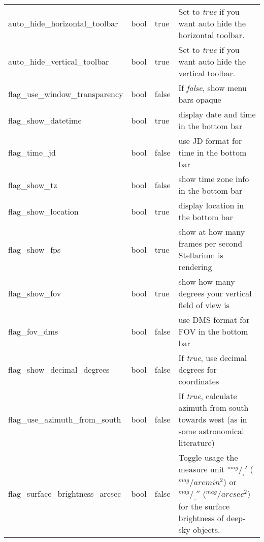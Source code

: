 \begin{longtable}{p{50mm}|l|l|p{55mm}}
auto\_hide\_horizontal\_toolbar & bool   & true  & Set to \emph{true} if you want auto hide the horizontal toolbar.\\%
auto\_hide\_vertical\_toolbar   & bool   & true  & Set to \emph{true} if you want auto hide the vertical toolbar.\\%
flag\_use\_window\_transparency & bool   & false & If \emph{false}, show menu bars opaque\\%
flag\_show\_datetime            & bool   & true  & display date and time in the bottom bar\\%
flag\_time\_jd                  & bool   & false & use JD format for time in the bottom bar\\%
flag\_show\_tz                  & bool   & false & show time zone info in the bottom bar\\%
flag\_show\_location            & bool   & true  & display location in the bottom bar\\%
flag\_show\_fps                 & bool   & true  & show at how many frames per second Stellarium is rendering\\%
flag\_show\_fov                 & bool   & true  & show how many degrees your vertical field of view is\\%
flag\_fov\_dms                  & bool   & false & use DMS format for FOV in the bottom bar\\\midrule
%
flag\_show\_decimal\_degrees    & bool   & false & If \emph{true}, use decimal degrees for coordinates\\\midrule
flag\_use\_azimuth\_from\_south & bool   & false & If \emph{true}, calculate azimuth from south towards west 
                                                   (as in some astronomical literature)\\\midrule
flag\_surface\_brightness\_arcsec  & bool  & false & Toggle usage the measure unit $^{mag}/_\square{'}$ ($^{mag}/arcmin^2$) or 
                                                     $^{mag}/_\square{''}$ ($^{mag}/arcsec^2$) for the surface brightness of deep-sky objects.\\%

\end{longtable}
